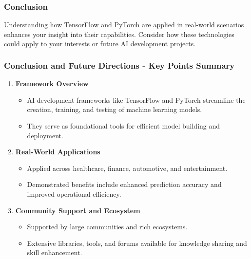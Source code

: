 \documentclass{beamer}
\begin{document}
\begin{frame}
    \frametitle{Conclusion}
    Understanding how TensorFlow and PyTorch are applied in real-world scenarios enhances your insight into their capabilities. Consider how these technologies could apply to your interests or future AI development projects.
\end{frame}

\begin{frame}[fragile]
    \frametitle{Conclusion and Future Directions - Key Points Summary}
    \begin{enumerate}
        \item \textbf{Framework Overview}
            \begin{itemize}
                \item AI development frameworks like TensorFlow and PyTorch streamline the creation, training, and testing of machine learning models.
                \item They serve as foundational tools for efficient model building and deployment.
            \end{itemize}
        \item \textbf{Real-World Applications}
            \begin{itemize}
                \item Applied across healthcare, finance, automotive, and entertainment.
                \item Demonstrated benefits include enhanced prediction accuracy and improved operational efficiency.
            \end{itemize}
        \item \textbf{Community Support and Ecosystem}
            \begin{itemize}
                \item Supported by large communities and rich ecosystems.
                \item Extensive libraries, tools, and forums available for knowledge sharing and skill enhancement.
            \end{itemize}
    \end{enumerate}
\end{frame}
\end{document}
